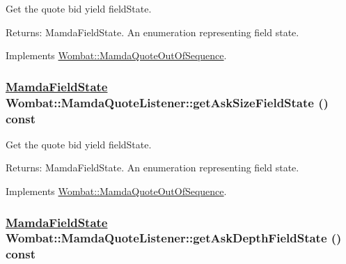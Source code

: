 Get the quote bid yield field\-State. 

\begin{Desc}
\item[Returns:]Mamda\-Field\-State. An enumeration representing field state. \end{Desc}


Implements \hyperlink{classWombat_1_1MamdaQuoteOutOfSequence_40369fc6cc5d586d7be261e868895988}{Wombat::Mamda\-Quote\-Out\-Of\-Sequence}.\hypertarget{classWombat_1_1MamdaQuoteListener_4e3d063324f15dacfaf2eec0f7f31e71}{
\subsubsection[getAskSizeFieldState]{\setlength{\rightskip}{0pt plus 5cm}\hyperlink{namespaceWombat_93aac974f2ab713554fd12a1fa3b7d2a}{Mamda\-Field\-State} Wombat::Mamda\-Quote\-Listener::get\-Ask\-Size\-Field\-State () const}}
\label{classWombat_1_1MamdaQuoteListener_4e3d063324f15dacfaf2eec0f7f31e71}


Get the quote bid yield field\-State. 

\begin{Desc}
\item[Returns:]Mamda\-Field\-State. An enumeration representing field state. \end{Desc}


Implements \hyperlink{classWombat_1_1MamdaQuoteOutOfSequence_df0784fb2f32f6deec369c5f0fbc269b}{Wombat::Mamda\-Quote\-Out\-Of\-Sequence}.\hypertarget{classWombat_1_1MamdaQuoteListener_f43a394a5e090162a80b749f682ecc38}{
\subsubsection[getAskDepthFieldState]{\setlength{\rightskip}{0pt plus 5cm}\hyperlink{namespaceWombat_93aac974f2ab713554fd12a1fa3b7d2a}{Mamda\-Field\-State} Wombat::Mamda\-Quote\-Listener::get\-Ask\-Depth\-Field\-State () const}}
\label{classWombat_1_1MamdaQuoteListener_f43a394a5e090162a80b749f682ecc38}


